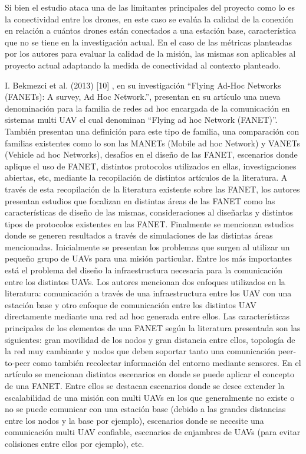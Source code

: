 Si bien el estudio ataca una de las limitantes principales del proyecto como lo es la conectividad entre los drones, en este caso se evalúa la calidad de la conexión en relación a cuántos drones están conectados a una estación base, característica que no se tiene en la investigación actual. En el caso de las métricas planteadas por los autores para evaluar la calidad de la misión, las mismas son aplicables al proyecto actual adaptando la medida de conectividad al contexto planteado.

I. Bekmezci et al. (2013) [10] , en su investigación “Flying Ad-Hoc Networks (FANETs): A survey, Ad Hoc Network.”, presentan en su artículo una nueva denominación para la familia de redes ad hoc encargada de la comunicación en sistemas multi UAV el cual denominan “Flying ad hoc Network (FANET)”. También presentan una definición para este tipo de familia, una comparación con familias existentes como lo son las MANETs (Mobile ad hoc Network) y VANETs (Vehicle ad hoc Networks), desafíos en el diseño de las FANET, escenarios donde aplique el uso de FANET, distintos protocolos utilizados en ellas, investigaciones abiertas, etc, mediante la recopilación de distintos artículos de la literatura. A través de esta recopilación de la literatura existente sobre las FANET, los autores presentan estudios que focalizan en distintas áreas de las FANET como las características de diseño de las mismas, consideraciones al diseñarlas y distintos tipos de protocolos existentes en las FANET. Finalmente se mencionan estudios donde se generen resultados a través de simulaciones de las distintas áreas mencionadas.
Inicialmente se presentan los problemas que surgen al utilizar un pequeño grupo de UAVs para una misión particular. Entre los más importantes está el problema del diseño la infraestructura necesaria para la comunicación entre los distintos UAVs. Los autores mencionan dos enfoques utilizados en la literatura: comunicación a través de una infraestructura entre los UAV con una estación base y otro enfoque de comunicación entre los distintos UAV directamente mediante una red ad hoc generada entre ellos. Las características principales de los elementos de una FANET según la literatura presentada son las siguientes: gran movilidad de los nodos y gran distancia entre ellos, topología de la red muy cambiante y nodos que deben soportar tanto una comunicación peer-to-peer como también recolectar información del entorno mediante sensores. En el artículo se mencionan distintos escenarios en donde se puede aplicar el concepto de una FANET. Entre ellos se destacan escenarios donde se desee extender la escalabilidad de una misión con multi UAVs en los que generalmente no existe o no se puede comunicar con una estación base (debido a las grandes distancias entre los nodos y la base por ejemplo), escenarios donde se necesite una comunicación multi UAV confiable, escenarios de enjambres de UAVs (para evitar colisiones entre ellos por ejemplo), etc.
